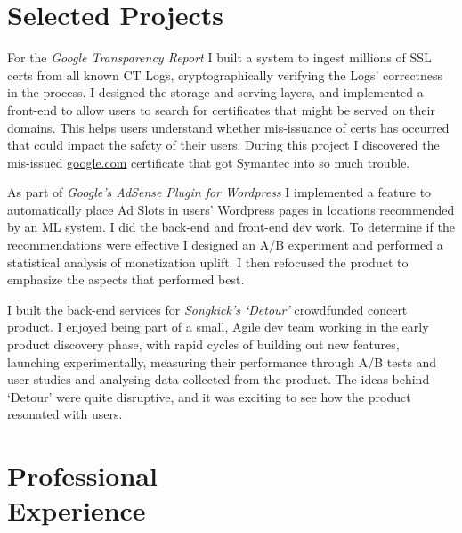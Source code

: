 \documentclass[line]{resume}
\begin{document}
\begin{resume}
    \section{\mysidestyle Selected Projects}

    For the \textsl{Google Transparency Report} I built a system to ingest millions of SSL certs from all known CT Logs,
    cryptographically verifying the Logs' correctness in the process.  I designed the storage and serving layers, and
    implemented a front-end to allow users to search for certificates that might be served on their domains.  This
    helps users understand whether mis-issuance of certs has occurred that could impact the safety of their users.
    During this project I discovered the mis-issued \url{google.com} certificate that got Symantec into so much trouble.

    As part of \textsl{Google's AdSense Plugin for Wordpress} I implemented a feature to automatically place Ad Slots
    in users' Wordpress pages in locations recommended by an ML system. I did the back-end and front-end dev work.  To
    determine if the recommendations were effective I designed an A/B experiment and performed a statistical analysis
    of monetization uplift.  I then refocused the product to emphasize the aspects that performed best.

    I built the back-end services for \textsl{Songkick's `Detour'} crowdfunded concert product. I enjoyed
    being part of a small, Agile dev team working in the early product discovery phase, with rapid cycles of building
    out new features, launching experimentally, measuring their performance through A/B tests and user studies and
    analysing data collected from the product. The ideas behind `Detour' were quite disruptive, and it was exciting to
    see how the product resonated with users.

    \section{\mysidestyle Professional\\Experience}


\end{resume}
\end{document}
